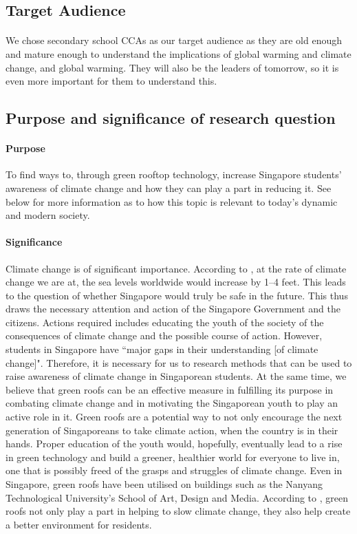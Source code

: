 \documentclass{article}
\begin{document}
\begin{multicols}{2}
  \subsection{Target Audience}
  \paragraph{} We chose secondary school CCAs as our target audience as
  they are old enough and mature enough to understand the implications
  of global warming and climate change, and global warming. They will
  also be the leaders of tomorrow, so it is even more important for them
  to understand this.


  \subsection{Purpose and significance of research question}
  \paragraph{Purpose} To find ways to, through green rooftop technology,
  increase Singapore students' awareness of climate change and how they
  can play a part in reducing it. See below for more information as to
  how this topic is relevant to today's dynamic and modern society.

  \paragraph{Significance} Climate change is of significant
  importance. According to \cite{nasa}, at the rate of climate
  change we are at, the sea levels worldwide would increase by 1--4
  feet. This leads to the question of whether Singapore would truly
  be safe in the future. This thus draws the necessary attention and
  action of the Singapore Government and the citizens. Actions required
  includes educating the youth of the society of the consequences of
  climate change and the possible course of action.  However, students
  in Singapore have ``major gaps in their understanding [of climate
  change]"\parencite{student_carbon_footprint}. Therefore, it is necessary
  for us to research methods that can be used to raise awareness of
  climate change in Singaporean students. At the same time, we believe
  that green roofs can be an effective measure in fulfilling its purpose
  in combating climate change and in motivating the Singaporean youth
  to play an active role in it. Green roofs are a potential way to not
  only encourage the next generation of Singaporeans to take climate
  action,  when the country is in their hands. Proper education of the
  youth would, hopefully, eventually lead to a rise in green technology
  and build a greener, healthier world for everyone to live in, one that
  is possibly freed of the grasps and struggles of climate change. Even
  in Singapore, green roofs have been utilised on buildings such as
  the Nanyang Technological University’s School of Art, Design and
  Media. According to \cite{greenbuild_advant1}, green roofs not only
  play a part in helping to slow climate change, they also help create
  a better environment for residents.



\end{multicols}
\end{document}
